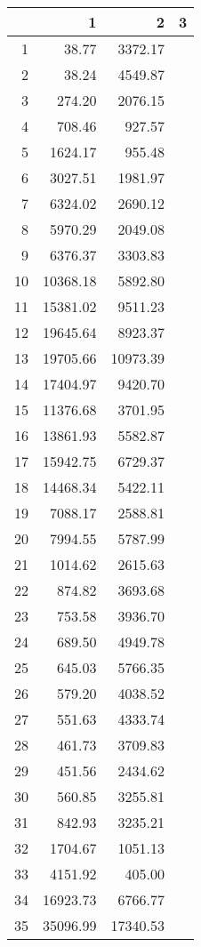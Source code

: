 \begin{table}[ht]
\centering
\begin{tabular}{rrrr}
  \hline
 & 1 & 2 & 3 \\ 
  \hline
1 & 38.77 & 3372.17 &  \\ 
  2 & 38.24 & 4549.87 &  \\ 
  3 & 274.20 & 2076.15 &  \\ 
  4 & 708.46 & 927.57 &  \\ 
  5 & 1624.17 & 955.48 &  \\ 
  6 & 3027.51 & 1981.97 &  \\ 
  7 & 6324.02 & 2690.12 &  \\ 
  8 & 5970.29 & 2049.08 &  \\ 
  9 & 6376.37 & 3303.83 &  \\ 
  10 & 10368.18 & 5892.80 &  \\ 
  11 & 15381.02 & 9511.23 &  \\ 
  12 & 19645.64 & 8923.37 &  \\ 
  13 & 19705.66 & 10973.39 &  \\ 
  14 & 17404.97 & 9420.70 &  \\ 
  15 & 11376.68 & 3701.95 &  \\ 
  16 & 13861.93 & 5582.87 &  \\ 
  17 & 15942.75 & 6729.37 &  \\ 
  18 & 14468.34 & 5422.11 &  \\ 
  19 & 7088.17 & 2588.81 &  \\ 
  20 & 7994.55 & 5787.99 &  \\ 
  21 & 1014.62 & 2615.63 &  \\ 
  22 & 874.82 & 3693.68 &  \\ 
  23 & 753.58 & 3936.70 &  \\ 
  24 & 689.50 & 4949.78 &  \\ 
  25 & 645.03 & 5766.35 &  \\ 
  26 & 579.20 & 4038.52 &  \\ 
  27 & 551.63 & 4333.74 &  \\ 
  28 & 461.73 & 3709.83 &  \\ 
  29 & 451.56 & 2434.62 &  \\ 
  30 & 560.85 & 3255.81 &  \\ 
  31 & 842.93 & 3235.21 &  \\ 
  32 & 1704.67 & 1051.13 &  \\ 
  33 & 4151.92 & 405.00 &  \\ 
  34 & 16923.73 & 6766.77 &  \\ 
  35 & 35096.99 & 17340.53 &  \\ 
   \hline
\end{tabular}
\end{table}
